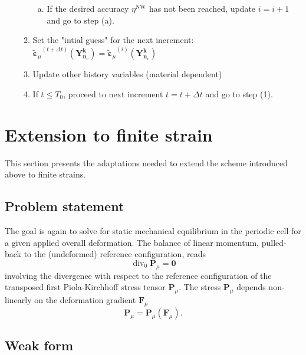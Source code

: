 \begin{framedbox}[htb]
\begin{center}
\begin{minipage}{0.9\textwidth}
\begin{enumerate}[(i)]
\begin{enumerate}[(1)]
\begin{enumerate}[(a)]
  \item If the desired accuracy \(\eta^{\mathrm{NW}}\) has not been reached, update \(i=i+1\) and go to step (a).
  \end{enumerate}
\item Set the "intial guess" for the next increment: \({\tilde{\bm\varepsilon}_\mu}^{(t+\Delta t)}\left(\bm{Y}_{\bm n_v}^{\bm  k}\right)={\tilde{\bm\varepsilon}_\mu}^{(i)}\left(\bm{Y}_{\bm n_v}^{\bm  k}\right)\)
\item Update other history variables (material dependent)
\item If \(t\leq T_0\), proceed to next increment \(t=t+\Delta t\) and go to step (1).
\end{enumerate}
\end{enumerate}
\end{minipage}
\end{center}
\end{framedbox}


\section{Extension to finite strain}

This section presents the adaptations needed to extend the scheme introduced above to finite strains.

\subsection{Problem statement}

The goal is again to solve for static mechanical equilibrium in the periodic cell for a given applied overall deformation.
The balance of linear momentum, pulled-back to the (undeformed) reference configuration, reads
\begin{equation} \label{eq:equilibrium_equation_finite_strain}
\operatorname{div}_0 \bm{P}_\mu=\bm{0}
\end{equation}
involving the divergence with respect to the reference configuration of the transposed first Piola-Kirchhoff stress tensor \(\bm{P}_\mu\).
The stress \(\bm{P}_\mu\) depends non-linearly on the deformation gradient \(\bm{F}_\mu\)
\begin{equation} \label{eq:constitutive_law_finite_strains}
\bm{P}_\mu=\bm{P}_\mu(\bm{F}_\mu).
\end{equation}

\subsection{Weak form}

